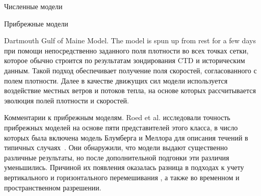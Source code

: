 \begin{chapter}{Численные модели}
\begin{section}{Прибрежные модели}
\begin{paragraph}{Dartmouth Gulf of Maine Model.}
The model is spun up from rest for a few days при помощи непосредственно 
заданного поля плотности во всех точках сетки, которое обычно строится по
результатам зондирования CTD и историческим данным. Такой подход
обеспечивает получение поля скоростей, согласованного с полем плотности. 
Далее в качестве движущих сил модели используется воздействие местных ветров 
и потоков тепла, на основе которых рассчитывается эволюция полей плотности
и скоростей.
%
\end{paragraph}

\begin{paragraph}{Комментарии к прибрежным моделям.}
Roed et al. исследовали точность
прибрежных моделей на основе пяти представителей этого класса, в число которых
была включена модель Блумберга и Меллора для описания течений в типичных 
случаях~\cite{Roed:1995}. Они обнаружили, что модели выдают существенно
различные результаты, но после дополнительной подгонки эти
различия уменьшились. Причиной их появления оказалась разница в подходах
к учету вертикального и горизонтального перемешивания%
, а также во временном и
пространственном разрешении.
% 


\end{paragraph}
\end{section}
\end{chapter}
